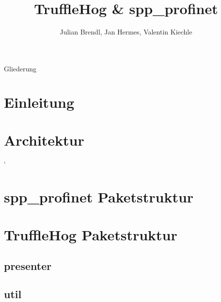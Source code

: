 \documentclass[18pt]{beamer}
\title[TruffleHog \& spp\_profinet]{TruffleHog \& spp\_profinet}
\author{Julian Brendl, Jan Hermes, Valentin Kiechle}
\institute{Fraunhofer IOSB}
\begin{document}

\begin{frame}
	\titlepage
\end{frame}

\begin{frame}{Gliederung}
	\tableofcontents
\end{frame}

\section{Einleitung}
	

\section{Architektur}
	
	
	
	
	
	
	
	
	
	
	
	
	
	
	
	
	
	
	
	`

\section{spp\_profinet Paketstruktur}

\section{TruffleHog Paketstruktur}
	
	\subsection{presenter}
		
	\subsection{util}
		
\end{document}
